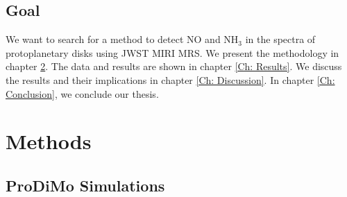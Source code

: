 \documentclass[oneside, single, authoryear, semicolon]{lion-msc}
\newcommand{\4}{$_4$}
\newcommand{\3}{$_3$}
\newcommand{\2}{$_2$}
\begin{document}
\section{Goal}
We want to search for a method to detect NO and NH\3 in the spectra of protoplanetary disks using JWST MIRI MRS. 
We present the methodology in chapter \ref{Ch: Methods}. The data and results are shown in chapter \ref{Ch: Results}. We discuss the results and their implications in chapter \ref{Ch: Discussion}. In chapter \ref{Ch: Conclusion}, we conclude our thesis.
\chapter{Methods}\label{Ch: Methods}
\section{ProDiMo Simulations}
\end{document}
